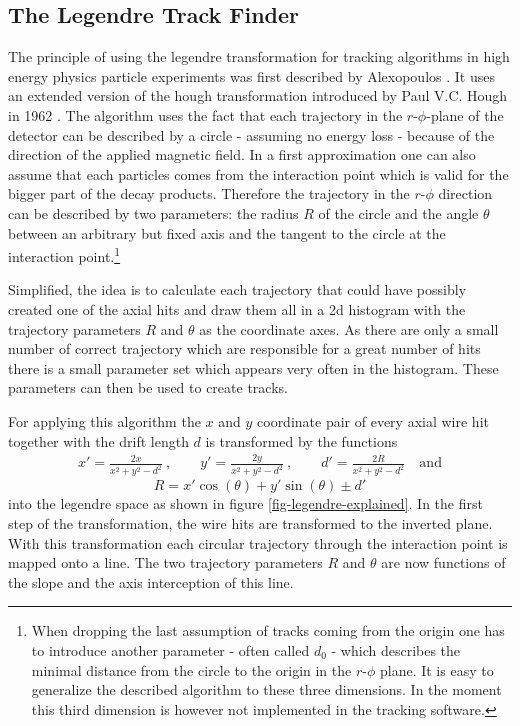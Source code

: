 \subsection{The Legendre Track Finder}
The principle of using the legendre transformation for tracking algorithms in high energy physics particle experiments was first described by Alexopoulos \cite{legendre}. It uses an extended version of the hough transformation introduced by Paul V.C. Hough in 1962 \cite{hough}. The algorithm uses the fact that each trajectory in the $r$-$\phi$-plane of the detector can be described by a circle - assuming no energy loss - because of the direction of the applied magnetic field. In a first approximation one can also assume that each particles comes from the interaction point which is valid for the bigger part of the decay products. Therefore the trajectory in the $r$-$\phi$ direction can be described by two parameters: the radius $R$ of the circle and the angle $\theta$ between an arbitrary but fixed axis and the tangent to the circle at the interaction point.\footnote{When dropping the last assumption of tracks coming from the origin one has to introduce another parameter - often called $d_0$ - which describes the minimal distance from the circle to the origin in the $r$-$\phi$ plane. It is easy to generalize the described algorithm to these three dimensions. In the moment this third dimension is however not implemented in the tracking software.}

Simplified, the idea is to calculate each trajectory that could have possibly created one of the axial hits and draw them all in a 2d histogram with the trajectory parameters $R$ and $\theta$ as the coordinate axes. As there are only a small number of correct trajectory which are responsible for a great number of hits there is a small parameter set which appears very often in the histogram. These parameters can then be used to create tracks.

For applying this algorithm the $x$ and $y$ coordinate pair of every axial wire hit together with the drift length $d$ is transformed by the functions
\begin{align*} x' = \frac{2x}{x^2 + y^2 - d^2}\ , \qquad y' = \frac{2y}{x^2 + y^2 - d^2}\ ,  \qquad d' = \frac{2R}{x^2 + y^2 - d^2}\quad \text{and} \end{align*}
$$R = x' \cos(\theta) + y' \sin(\theta) \pm d'$$
into the legendre space as shown in figure \ref{fig-legendre-explained}. In the first step of the transformation, the wire hits are transformed to the inverted plane. With this transformation each circular trajectory through the interaction point is mapped onto a line. The two trajectory parameters $R$ and $\theta$ are now functions of the slope and the axis interception of this line. 

